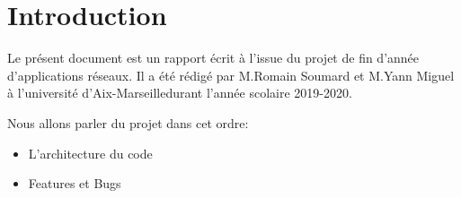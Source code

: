 \section{Introduction}

Le présent document est un rapport écrit à l'issue du projet de fin d'année d'applications réseaux. Il a été rédigé par M.Romain Soumard et M.Yann Miguel à l'université d'Aix-Marseilledurant l'année scolaire 2019-2020.

Nous allons parler du projet dans cet ordre:
\begin{itemize}
    \item L'architecture du code
    \item Features et Bugs
\end{itemize}

